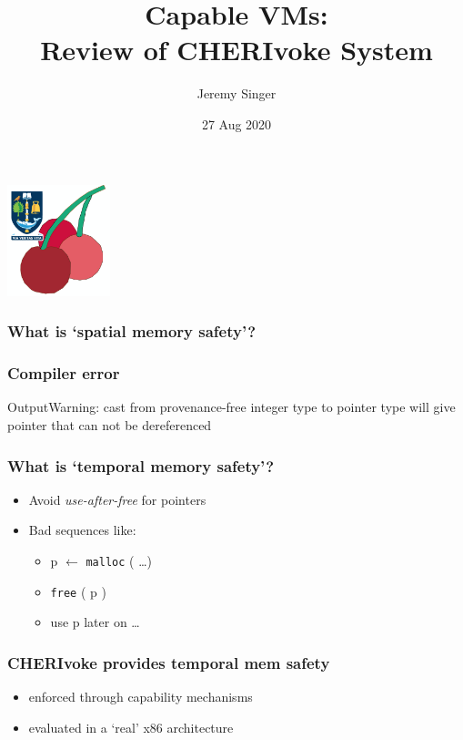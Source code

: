 \documentclass[20pt]{beamer}
\title{Capable VMs:\\ Review of CHERIvoke System}
\author{Jeremy Singer}
\date{27 Aug 2020}
\begin{document}
\begin{frame}
  \includegraphics[width=3cm]{logo.png}
  \titlepage

\end{frame}

\begin{frame}
  \frametitle{What is  `spatial memory safety'?}

  
  
\end{frame}

\begin{frame}
  \frametitle{Compiler error}
    \begin{block}{Output}Warning: cast from provenance-free integer type to pointer type will give pointer that can not be dereferenced\end{block}
\end{frame}

\begin{frame}
  \frametitle{What is `temporal memory safety'?}

  \begin{itemize}
  \item Avoid \emph{use-after-free} for pointers
  \item Bad sequences like:
    \begin{itemize}
    \item p $\leftarrow$ \texttt{malloc} ( \ldots )
    \item \texttt{free} ( p )
    \item use p later on \ldots
    \end{itemize}
  \end{itemize}
\end{frame}

\begin{frame}
  \frametitle{CHERIvoke provides temporal mem safety}
  \begin{itemize}
  \item enforced through capability mechanisms
  \item evaluated in a `real' x86 architecture
  \end{itemize}
\end{frame}
\end{document}
